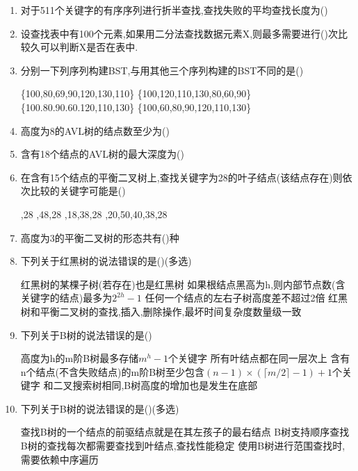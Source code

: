\documentclass[12pt, a4paper, oneside, UTF8]{ctexbook}
\begin{document}
\begin{enumerate}
    \item 对于511个关键字的有序序列进行折半查找,查找失败的平均查找长度为(\qquad)
    \item 设查找表中有100个元素,如果用二分法查找数据元素X,则最多需要进行(\qquad)次比较久可以判断X是否在表中.
    \item 分别一下列序列构建BST,与用其他三个序列构建的BST不同的是(\qquad)
    \begin{choices}[2]
        \task \{100,80,69,90,120,130,110\} \task \{100,120,110,130,80,60,90\}
        \task \{100.80.90.60.120,110,130\} \task \{100,60,80,90,120,110,130\}
    \end{choices}

    \item 高度为8的AVL树的结点数至少为(\qquad)
    \item 含有18个结点的AVL树的最大深度为(\qquad)
    \item 在含有15个结点的平衡二叉树上,查找关键字为28的叶子结点(该结点存在)则依次比较的关键字可能是(\qquad)
    \begin{choices}
        ,28 ,48,28 ,18,38,28 ,20,50,40,38,28
    \end{choices}
    \item 高度为3的平衡二叉树的形态共有(\qquad)种
    \item 下列关于红黑树的说法错误的是(\qquad)(多选)
    \begin{choices}[1]
        \task 红黑树的某棵子树(若存在)也是红黑树
        \task 如果根结点黑高为h,则内部节点数(含关键字的结点)最多为$2^{2h}-1$
        \task 任何一个结点的左右子树高度差不超过2倍
        \task 红黑树和平衡二叉树的查找,插入,删除操作,最坏时间复杂度数量级一致
    \end{choices}
    \item 下列关于B树的说法错误的是(\qquad)
    \begin{choices}[1]
        \task 高度为h的m阶B树最多存储$m^h-1$个关键字
        \task 所有叶结点都在同一层次上
        \task 含有n个结点(不含失败结点)的m阶B树至少包含$(n-1)\times(\lceil m/2\rceil-1)+1$个关键字
        \task 和二叉搜索树相同,B树高度的增加也是发生在底部
    \end{choices}
    \item 下列关于B树的说法错误的是(\qquad)(多选)
    \begin{choices}[1]
        \task 查找B树的一个结点的前驱结点就是在其左孩子的最右结点
        \task B树支持顺序查找
        \task B树的查找每次都需要查找到叶结点,查找性能稳定
        \task 使用B树进行范围查找时,需要依赖中序遍历
    \end{choices}

\end{enumerate}
\end{document}
